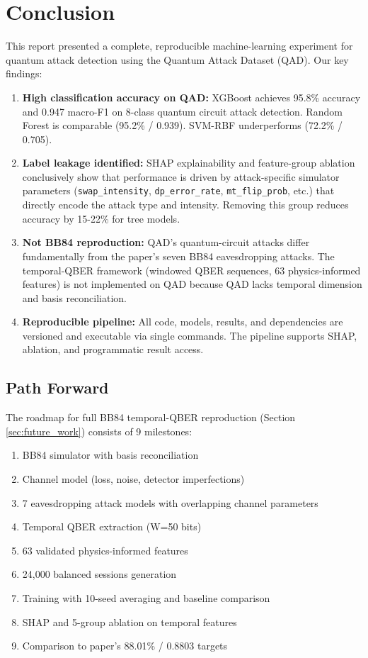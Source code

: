 \section{Conclusion}
\label{sec:conclusion}

This report presented a complete, reproducible machine-learning experiment for quantum attack detection using the Quantum Attack Dataset (QAD). Our key findings:

\begin{enumerate}
    \item \textbf{High classification accuracy on QAD:} XGBoost achieves 95.8\% accuracy and 0.947 macro-F1 on 8-class quantum circuit attack detection. Random Forest is comparable (95.2\% / 0.939). SVM-RBF underperforms (72.2\% / 0.705).
    
    \item \textbf{Label leakage identified:} SHAP explainability and feature-group ablation conclusively show that performance is driven by attack-specific simulator parameters (\texttt{swap\_intensity}, \texttt{dp\_error\_rate}, \texttt{mt\_flip\_prob}, etc.) that directly encode the attack type and intensity. Removing this group reduces accuracy by 15-22\% for tree models.
    
    \item \textbf{Not BB84 reproduction:} QAD's quantum-circuit attacks differ fundamentally from the paper's seven BB84 eavesdropping attacks. The temporal-QBER framework (windowed QBER sequences, 63 physics-informed features) is not implemented on QAD because QAD lacks temporal dimension and basis reconciliation.
    
    \item \textbf{Reproducible pipeline:} All code, models, results, and dependencies are versioned and executable via single commands. The pipeline supports SHAP, ablation, and programmatic result access.
\end{enumerate}

\subsection{Path Forward}
The roadmap for full BB84 temporal-QBER reproduction (Section \ref{sec:future_work}) consists of 9 milestones:
\begin{enumerate}
    \item BB84 simulator with basis reconciliation
    \item Channel model (loss, noise, detector imperfections)
    \item 7 eavesdropping attack models with overlapping channel parameters
    \item Temporal QBER extraction (W=50 bits)
    \item 63 validated physics-informed features
    \item 24,000 balanced sessions generation
    \item Training with 10-seed averaging and baseline comparison
    \item SHAP and 5-group ablation on temporal features
    \item Comparison to paper's 88.01\% / 0.8803 targets
\end{enumerate}

